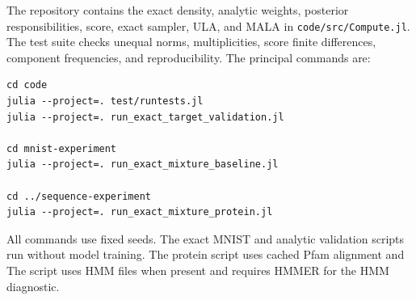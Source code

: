 The repository contains the exact density, analytic weights, posterior
responsibilities, score, exact sampler, ULA, and MALA in
\texttt{code/src/Compute.jl}.
The test suite checks unequal norms, multiplicities, score finite differences,
component frequencies, and reproducibility. The principal commands are:
\begin{verbatim}
cd code
julia --project=. test/runtests.jl
julia --project=. run_exact_target_validation.jl

cd mnist-experiment
julia --project=. run_exact_mixture_baseline.jl

cd ../sequence-experiment
julia --project=. run_exact_mixture_protein.jl
\end{verbatim}
All commands use fixed seeds. The exact MNIST and analytic validation scripts
run without model training. The protein script uses cached Pfam alignment and
The script uses HMM files when present and requires HMMER for the HMM
diagnostic.
